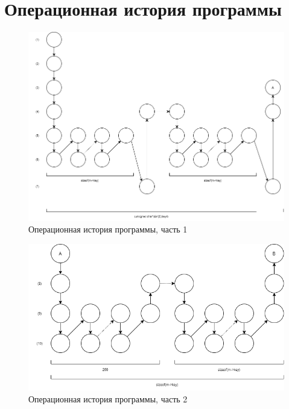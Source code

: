 \documentclass[12pt]{report}
\begin{document}
\section{Операционная история программы}

\begin{figure}[hp!]
	\centering
	\includegraphics[scale=0.6]{report_files/operation_history_1.png}
	\caption{Операционная история программы, часть 1}
	\label{fig:mpr}
\end{figure}

\begin{figure}[hp!]
	\centering
	\includegraphics[scale=0.65]{report_files/operation_history_2.png}
	\caption{Операционная история программы, часть 2}
	\label{fig:mpr}
\end{figure}
\end{document}
